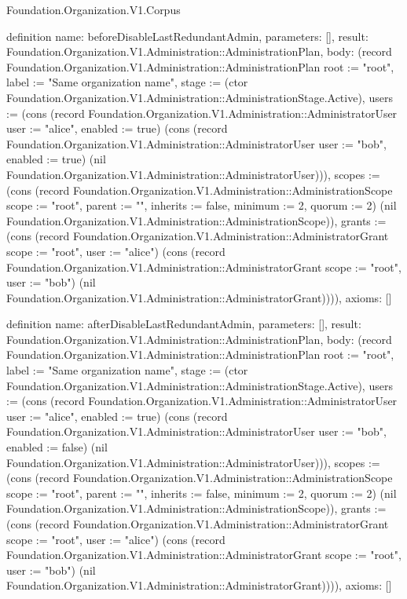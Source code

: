 \begin{lexlean}{Foundation.Organization.V1.Corpus}
\begin{semanticmodule}
definition{
  name: beforeDisableLastRedundantAdmin,
  parameters: [],
  result: Foundation.Organization.V1.Administration::AdministrationPlan,
  body: (record Foundation.Organization.V1.Administration::AdministrationPlan {root := "root", label := "Same organization name", stage := (ctor Foundation.Organization.V1.Administration::AdministrationStage.Active), users := (cons (record Foundation.Organization.V1.Administration::AdministratorUser {user := "alice", enabled := true}) (cons (record Foundation.Organization.V1.Administration::AdministratorUser {user := "bob", enabled := true}) (nil Foundation.Organization.V1.Administration::AdministratorUser))), scopes := (cons (record Foundation.Organization.V1.Administration::AdministrationScope {scope := "root", parent := "", inherits := false, minimum := 2, quorum := 2}) (nil Foundation.Organization.V1.Administration::AdministrationScope)), grants := (cons (record Foundation.Organization.V1.Administration::AdministratorGrant {scope := "root", user := "alice"}) (cons (record Foundation.Organization.V1.Administration::AdministratorGrant {scope := "root", user := "bob"}) (nil Foundation.Organization.V1.Administration::AdministratorGrant)))}),
  axioms: []
}

definition{
  name: afterDisableLastRedundantAdmin,
  parameters: [],
  result: Foundation.Organization.V1.Administration::AdministrationPlan,
  body: (record Foundation.Organization.V1.Administration::AdministrationPlan {root := "root", label := "Same organization name", stage := (ctor Foundation.Organization.V1.Administration::AdministrationStage.Active), users := (cons (record Foundation.Organization.V1.Administration::AdministratorUser {user := "alice", enabled := true}) (cons (record Foundation.Organization.V1.Administration::AdministratorUser {user := "bob", enabled := false}) (nil Foundation.Organization.V1.Administration::AdministratorUser))), scopes := (cons (record Foundation.Organization.V1.Administration::AdministrationScope {scope := "root", parent := "", inherits := false, minimum := 2, quorum := 2}) (nil Foundation.Organization.V1.Administration::AdministrationScope)), grants := (cons (record Foundation.Organization.V1.Administration::AdministratorGrant {scope := "root", user := "alice"}) (cons (record Foundation.Organization.V1.Administration::AdministratorGrant {scope := "root", user := "bob"}) (nil Foundation.Organization.V1.Administration::AdministratorGrant)))}),
  axioms: []
}


\end{semanticmodule}
\end{lexlean}
